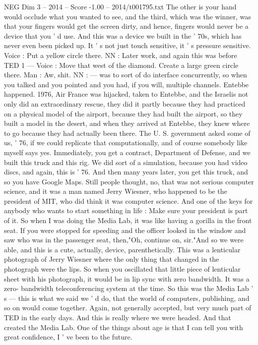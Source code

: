 \begin{textsample}{NEG Dim 3 – 2014 – Score -1.00 – 2014/t001795.txt}
The other is your hand would occlude what you wanted to see, and the third, which was the winner, was that your fingers would get the screen dirty, and hence, fingers would never be a device that you ' d use.
And this was a device we built in the ' 70s, which has never even been picked up.
It ' s not just touch sensitive, it ' s pressure sensitive.
Voice : Put a yellow circle there.
NN : Later work, and again this was before TED 1 — Voice : Move that west of the diamond.
Create a large green circle there.
Man : Aw, shit.
NN : — was to sort of do interface concurrently, so when you talked and you pointed and you had, if you will, multiple channels.
Entebbe happened. 1976, Air France was hijacked, taken to Entebbe, and the Israelis not only did an extraordinary rescue, they did it partly because they had practiced on a physical model of the airport, because they had built the airport, so they built a model in the desert, and when they arrived at Entebbe, they knew where to go because they had actually been there.
The U.
S. government asked some of us, ' 76, if we could replicate that computationally, and of course somebody like myself says yes.
Immediately, you get a contract, Department of Defense, and we built this truck and this rig.
We did sort of a simulation, because you had video discs, and again, this is ' 76.
And then many years later, you get this truck, and so you have Google Maps.
Still people thought, no, that was not serious computer science, and it was a man named Jerry Wiesner, who happened to be the president of MIT, who did think it was computer science.
And one of the keys for anybody who wants to start something in life : Make sure your president is part of it.
So when I was doing the Media Lab, it was like having a gorilla in the front seat.
If you were stopped for speeding and the officer looked in the window and saw who was in the passenger seat, then,"Oh, continue on, sir."And so we were able, and this is a cute, actually, device, parenthetically.
This was a lenticular photograph of Jerry Wiesner where the only thing that changed in the photograph were the lips.
So when you oscillated that little piece of lenticular sheet with his photograph, it would be in lip sync with zero bandwidth.
It was a zero- bandwidth teleconferencing system at the time.
So this was the Media Lab ' s — this is what we said we ' d do, that the world of computers, publishing, and so on would come together.
Again, not generally accepted, but very much part of TED in the early days.
And this is really where we were headed.
And that created the Media Lab.
One of the things about age is that I can tell you with great confidence, I ' ve been to the future.

\end{textsample}
